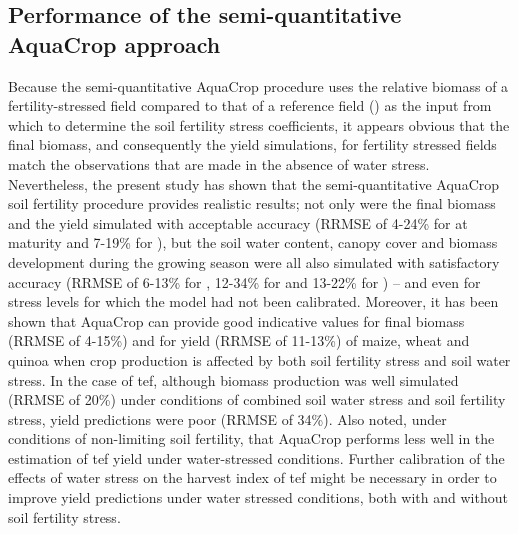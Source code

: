 \subsection{Performance of the semi-quantitative AquaCrop approach}
Because the semi-quantitative AquaCrop procedure uses the relative biomass of a fertility-stressed field compared to that of a reference field (\Brel) as the input from which to determine the soil fertility stress coefficients, it appears obvious that the final biomass, and consequently the yield simulations, for fertility stressed fields match the observations that are made in the absence of water stress. Nevertheless, the present study has shown that the semi-quantitative AquaCrop soil fertility procedure provides realistic results; not only were the final biomass and the yield simulated with acceptable accuracy (RRMSE of 4-24\% for \B at maturity and 7-19\% for \Y), but the soil water content, canopy cover and biomass development during the growing season were all also simulated with satisfactory accuracy (RRMSE of 6-13\% for \SWCr, 12-34\% for \CC and 13-22\% for \B) – and even for stress levels for which the model had not been calibrated. Moreover, it has been shown that AquaCrop can provide good indicative values for final biomass (RRMSE of 4-15\%) and for yield (RRMSE of 11-13\%) of maize, wheat and quinoa when crop production is affected by both soil fertility stress and soil water stress. In the case of tef, although biomass production was well simulated (RRMSE of 20\%) under conditions of combined soil water stress and soil fertility stress, yield predictions were poor (RRMSE of 34\%). Also \textcite{tsegay2012} noted, under conditions of non-limiting soil fertility, that AquaCrop performs less well in the estimation of tef yield under water-stressed conditions. Further calibration of the effects of water stress on the harvest index of tef might be necessary in order to improve yield predictions under water stressed conditions, both with and without soil fertility stress.

